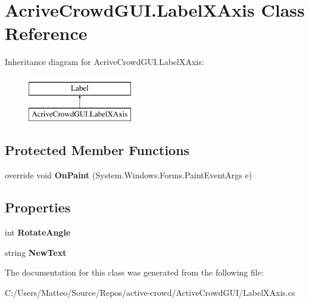 \hypertarget{class_acrive_crowd_g_u_i_1_1_label_x_axis}{}\section{Acrive\+Crowd\+G\+U\+I.\+Label\+X\+Axis Class Reference}
\label{class_acrive_crowd_g_u_i_1_1_label_x_axis}
Inheritance diagram for Acrive\+Crowd\+G\+U\+I.\+Label\+X\+Axis\+:\begin{figure}[H]
\begin{center}
\leavevmode
\includegraphics[height=2.000000cm]{class_acrive_crowd_g_u_i_1_1_label_x_axis}
\end{center}
\end{figure}
\subsection*{Protected Member Functions}
\begin{DoxyCompactItemize}
\item 
\hypertarget{class_acrive_crowd_g_u_i_1_1_label_x_axis_a0d0303b003fe6e6a2541f12b25edd141}{}override void {\bfseries On\+Paint} (System.\+Windows.\+Forms.\+Paint\+Event\+Args e)\label{class_acrive_crowd_g_u_i_1_1_label_x_axis_a0d0303b003fe6e6a2541f12b25edd141}

\end{DoxyCompactItemize}
\subsection*{Properties}
\begin{DoxyCompactItemize}
\item 
\hypertarget{class_acrive_crowd_g_u_i_1_1_label_x_axis_a71cfc4a36da0f8cf09667ecaa9565d3f}{}int {\bfseries Rotate\+Angle}\label{class_acrive_crowd_g_u_i_1_1_label_x_axis_a71cfc4a36da0f8cf09667ecaa9565d3f}

\item 
\hypertarget{class_acrive_crowd_g_u_i_1_1_label_x_axis_a1cf2ce67a52be1d8831318d19b39d534}{}string {\bfseries New\+Text}\label{class_acrive_crowd_g_u_i_1_1_label_x_axis_a1cf2ce67a52be1d8831318d19b39d534}

\end{DoxyCompactItemize}


The documentation for this class was generated from the following file\+:\begin{DoxyCompactItemize}
\item 
C\+:/\+Users/\+Matteo/\+Source/\+Repos/active-\/crowd/\+Active\+Crowd\+G\+U\+I/Label\+X\+Axis.\+cs\end{DoxyCompactItemize}
